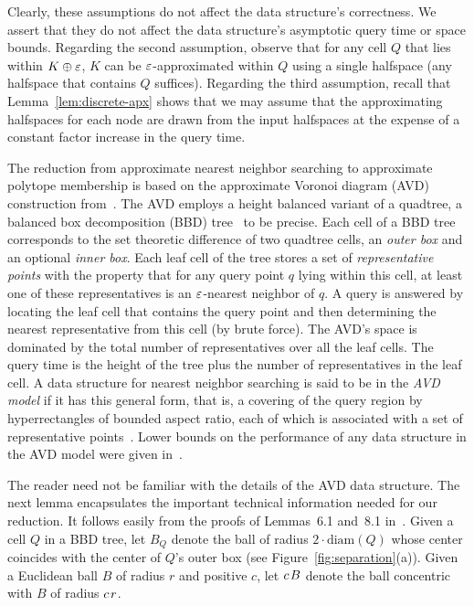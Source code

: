 \documentclass[11pt]{article}   \usepackage[letterpaper,hmargin=2.1cm,vmargin=3cm]{geometry}
\newcommand{\diam}{\mathrm{diam}}
\renewcommand{\P}{\kern+1pt}    \newcommand{\N}{\kern-2pt}      \newcommand{\NN}{\kern-4pt}     \newcommand{\polar}[1]{\mathrm{polar}(#1)}            \newcommand{\polarX}[2]{\mathrm{polar}_{#1}(#2)}
\begin{document}
Clearly, these assumptions do not affect the data structure's correctness. We assert that they do not affect the data structure's asymptotic query time or space bounds. Regarding the second assumption, observe that for any cell $Q$ that lies within $K \oplus \varepsilon$, $K$ can be $\varepsilon$-approximated within $Q$ using a single halfspace (any halfspace that contains $Q$ suffices). Regarding the third assumption, recall that Lemma~\ref{lem:discrete-apx} shows that we may assume that the approximating halfspaces for each node are drawn from the input halfspaces at the expense of a constant factor increase in the query time.

The reduction from approximate nearest neighbor searching to approximate polytope membership is based on the approximate Voronoi diagram (AVD) construction from~\cite{AVD-JACM}. The AVD employs a height balanced variant of a quadtree, a balanced box decomposition (BBD) tree~\cite{ARS} to be precise. Each cell of a BBD tree corresponds to the set theoretic difference of two quadtree cells, an \emph{outer box} and an optional \emph{inner box}. Each leaf cell of the tree stores a set of \emph{representative points} with the property that for any query point $q$ lying within this cell, at least one of these representatives is an $\varepsilon$-nearest neighbor of $q$. A query is answered by locating the leaf cell that contains the query point and then determining the nearest representative from this cell (by brute force). The AVD's space is dominated by the total number of representatives over all the leaf cells. The query time is the height of the tree plus the number of representatives in the leaf cell. A data structure for nearest neighbor searching is said to be in the \emph{AVD model} if it has this general form, that is, a covering of the query region by hyperrectangles of bounded aspect ratio, each of which is associated with a set of representative points~\cite{AVD-JACM}. Lower bounds on the performance of any data structure in the AVD model were given in~\cite{AVD-JACM}.

The reader need not be familiar with the details of the AVD data structure. The next lemma encapsulates the important technical information needed for our reduction. It follows easily from the proofs of Lemmas~{6.1} and~{8.1} in~\cite{AVD-JACM}. Given a cell $Q$ in a BBD tree, let $B_Q$ denote the ball of radius $2 \cdot \diam(Q)$ whose center coincides with the center of $Q$'s outer box (see Figure~\ref{fig:separation}(a)). Given a Euclidean ball $B$ of radius $r$ and positive $c$, let $c \P B$ denote the ball concentric with $B$ of radius $c \P r$.
\end{document}
